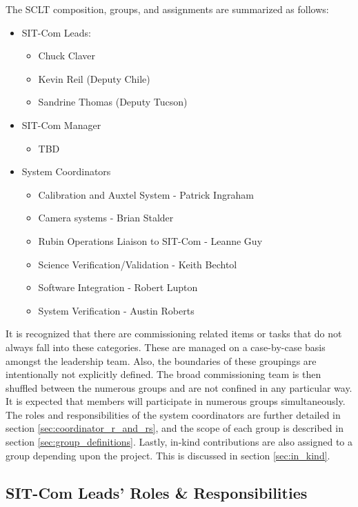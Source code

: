 \documentclass[SE,lsstdraft,authoryear,toc]{lsstdoc}
\begin{document}
The SCLT composition, groups, and assignments are summarized as follows:
\begin{itemize}
    \item SIT-Com Leads:
    \begin{itemize}
        \item Chuck Claver
        \item Kevin Reil (Deputy Chile)
        \item Sandrine Thomas (Deputy Tucson)
    \end{itemize}
    \item SIT-Com Manager
    \begin{itemize}
        \item TBD
    \end{itemize}
    \item System Coordinators
    \begin{itemize}
        \item Calibration and Auxtel System - Patrick Ingraham
        \item Camera systems - Brian Stalder
        \item Rubin Operations Liaison to SIT-Com - Leanne Guy
        \item Science Verification/Validation - Keith Bechtol
        \item Software Integration - Robert Lupton
        \item System Verification - Austin Roberts
    \end{itemize}
\end{itemize}


It is recognized that there are commissioning related items or tasks that do not always fall into these categories.
These are managed on a case-by-case basis amongst the leadership team.
Also, the boundaries of these groupings are intentionally not explicitly defined.
The broad commissioning team is then shuffled between the numerous groups and are not confined in any particular way.
It is expected that members will participate in numerous groups simultaneously.
The roles and responsibilities of the system coordinators are further detailed in section \ref{sec:coordinator_r_and_rs}, and the scope of each group is described in section \ref{sec:group_definitions}.
Lastly, in-kind contributions are also assigned to a group depending upon the project.
This is discussed in section \ref{sec:in_kind}.

\subsection{SIT-Com Leads’ Roles \& Responsibilities}
\label{sec:r_and_rs}
\end{document}
